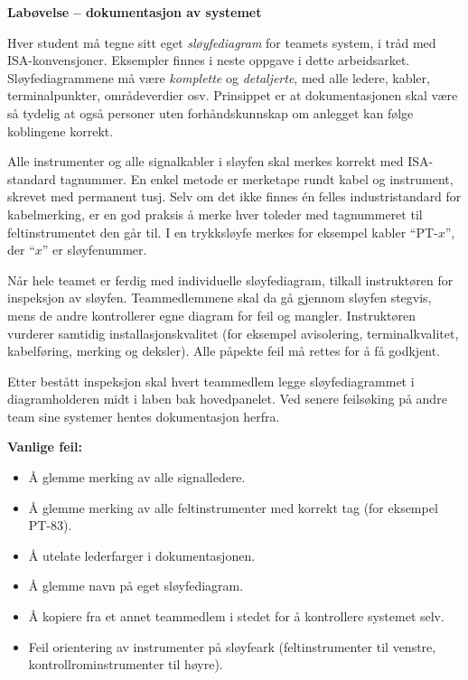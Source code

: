 \noindent
{\bf Labøvelse -- dokumentasjon av systemet}

\vskip 5pt

Hver student må tegne sitt eget {\it sløyfediagram} for teamets system, i tråd med ISA-konvensjoner. Eksempler finnes i neste oppgave i dette arbeidsarket. Sløyfediagrammene må være {\it komplette} og {\it detaljerte}, med alle ledere, kabler, terminalpunkter, områdeverdier osv. Prinsippet er at dokumentasjonen skal være så tydelig at også personer uten forhåndskunnskap om anlegget kan følge koblingene korrekt.

Alle instrumenter og alle signalkabler i sløyfen skal merkes korrekt med ISA-standard tagnummer. En enkel metode er merketape rundt kabel og instrument, skrevet med permanent tusj. Selv om det ikke finnes én felles industristandard for kabelmerking, er en god praksis å merke hver toleder med tagnummeret til feltinstrumentet den går til. I en trykksløyfe merkes for eksempel kabler ``PT-$x$'', der ``$x$'' er sløyfenummer.

Når hele teamet er ferdig med individuelle sløyfediagram, tilkall instruktøren for inspeksjon av sløyfen. Teammedlemmene skal da gå gjennom sløyfen stegvis, mens de andre kontrollerer egne diagram for feil og mangler. Instruktøren vurderer samtidig installasjonskvalitet (for eksempel avisolering, terminalkvalitet, kabelføring, merking og deksler). Alle påpekte feil må rettes for å få godkjent.

Etter bestått inspeksjon skal hvert teammedlem legge sløyfediagrammet i diagramholderen midt i laben bak hovedpanelet. Ved senere feilsøking på andre team sine systemer hentes dokumentasjon herfra.

\vskip 10pt

{\bf Vanlige feil:}

\begin{itemize}
\item{} Å glemme merking av alle signalledere.
\item{} Å glemme merking av alle feltinstrumenter med korrekt tag (for eksempel PT-83).
\item{} Å utelate lederfarger i dokumentasjonen.
\item{} Å glemme navn på eget sløyfediagram.
\item{} Å kopiere fra et annet teammedlem i stedet for å kontrollere systemet selv.
\item{} Feil orientering av instrumenter på sløyfeark (feltinstrumenter til venstre, kontrollrominstrumenter til høyre).
\end{itemize}

